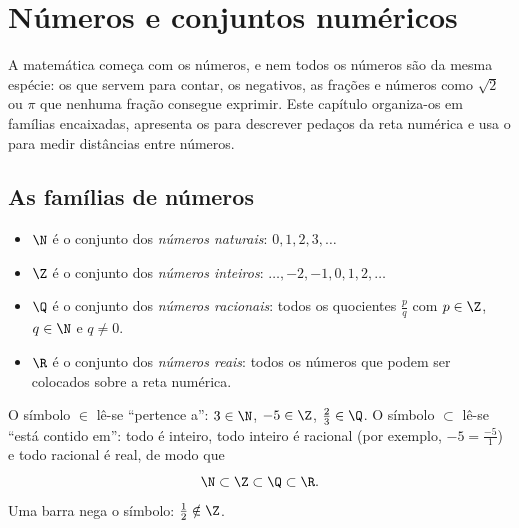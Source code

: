 \chapter{Números e conjuntos numéricos}\label{ch:g10:numbers}

A matemática começa com os números, e nem todos os números são da mesma
espécie: os que servem para contar, os negativos, as frações e números
como $\sqrt 2$ ou $\pi$ que nenhuma fração consegue exprimir. Este
capítulo organiza-os em famílias encaixadas, apresenta os  para
descrever pedaços da reta numérica e usa o  para medir distâncias
entre números.

\section{As famílias de números}

\begin{definition}\label{def:g10:numbers:sets}
\begin{itemize}
  \item $\N$ é o conjunto dos \emph{números naturais}:
        $0, 1, 2, 3, \dots$
  \item $\Z$ é o conjunto dos \emph{números inteiros}:
        $\dots, -2, -1, 0, 1, 2, \dots$
  \item $\Q$ é o conjunto dos \emph{números racionais}:
        todos os quocientes $\frac{p}{q}$ com $p \in \Z$, $q \in \N$ e
        $q \neq 0$.
  \item $\R$ é o conjunto dos \emph{números reais}: todos
        os números que podem ser colocados sobre a reta numérica.
\end{itemize}
\end{definition}

\begin{notation}
O símbolo $\in$ lê-se ``pertence a'': $3 \in \N$, $-5 \in \Z$,
$\frac23 \in \Q$. O símbolo $\subset$ lê-se ``está contido em'': todo
 é inteiro, todo inteiro é racional
(por exemplo, $-5 = \frac{-5}{1}$) e todo racional é real, de modo que
\[
\N \subset \Z \subset \Q \subset \R .
\]
Uma barra nega o símbolo: $\frac12 \notin \Z$.
\end{notation}

